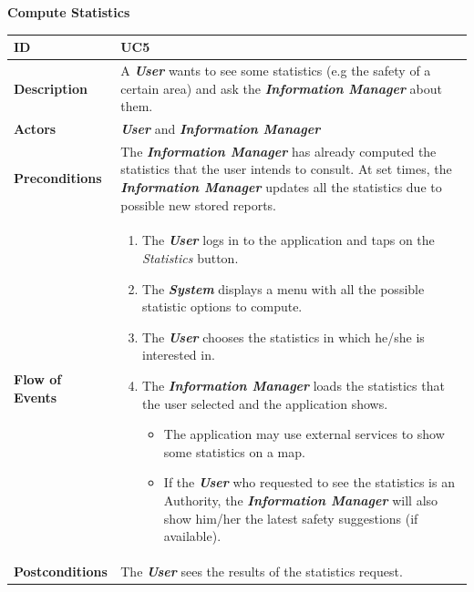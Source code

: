 \documentclass{report}
\begin{document}
\begin{center}
	\textbf{Compute Statistics}
\end{center}
\begin{tabularx}{\linewidth}{| l | X |}
	\hline
	\textbf{ID} & UC5\\
	
	\hline
	\textbf{Description} & A \textbf{\textit{User}} wants to see some statistics (e.g the safety of a certain area) and ask the \textbf{\textit{Information Manager}} about them.\\
	
	\hline
	\textbf{Actors} & \textbf{\textit{User}} and \textbf{\textit{Information Manager}}\\
	
	\hline
	\textbf{Preconditions} & The \textbf{\textit{Information Manager}} has already computed the statistics that the user intends to consult. At set times, the \textbf{\textit{Information Manager}} updates all the statistics due to possible new stored reports. \\
	
	\hline
	\textbf{Flow of Events} & \parbox{0.7\textwidth}{\begin{enumerate}
			\item The \textbf{\textit{User}} logs in to the application and taps on the \textit{Statistics} button.
			\item The \textbf{\textit{System}} displays a menu with all the possible statistic options to compute.
			\item The \textbf{\textit{User}} chooses the statistics in which he/she is interested in.
			
			\item The \textbf{\textit{Information Manager}} loads the statistics that the user selected and the application shows. 
			\begin{itemize}
				\item The application may use external services to show some statistics on a map.
				\item If the \textbf{\textit{User}} who requested to see the statistics is an Authority, the \textbf{\textit{Information Manager}} will also show him/her the latest safety suggestions (if available).
			\end{itemize}
			
	\end{enumerate}}\\
	
	\hline
	\textbf{Postconditions} & The \textbf{\textit{User}} sees the results of the statistics request.\\
	

\end{tabularx}
\end{document}
